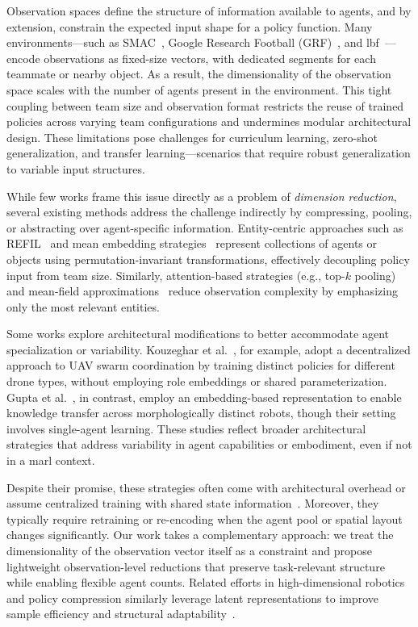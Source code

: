 Observation spaces define the structure of information available to agents, 
and by extension, constrain the expected input shape for a policy function.
Many environments—such as SMAC~\cite{samvelyan2019}, 
Google Research Football (GRF)~\cite{kurach2020}, 
and \gls{lbf}~\cite{papoudakis2021}—encode observations as fixed-size vectors, 
with dedicated segments for each teammate or nearby object. 
As a result, the dimensionality of the observation space scales with the 
number of agents present in the environment. 
This tight coupling between team size and observation format restricts the 
reuse of trained policies across varying team configurations and undermines 
modular architectural design. These limitations pose challenges for curriculum learning, 
zero-shot generalization, and transfer learning—scenarios that require robust generalization 
to variable input structures.

While few works frame this issue directly as a problem of \textit{dimension reduction}, 
several existing methods address the challenge indirectly by compressing, pooling, 
or abstracting over agent-specific information. Entity-centric approaches such as 
REFIL~\cite{iqbal2021} and mean embedding strategies~\cite{huttenrauch2019} represent 
collections of agents or objects using permutation-invariant transformations, effectively 
decoupling policy input from team size. Similarly, attention-based strategies 
(e.g., top-$k$ pooling) and mean-field approximations~\cite{yang2021a} reduce 
observation complexity by emphasizing only the most relevant entities.

Some works explore architectural modifications to better accommodate agent specialization 
or variability. Kouzeghar et al.~\cite{kouzeghar2023}, for example, adopt a decentralized 
approach to UAV swarm coordination by training distinct policies for different drone types, 
without employing role embeddings or shared parameterization. 
Gupta et al.~\cite{gupta2017a}, in contrast, employ an embedding-based representation to 
enable knowledge transfer across morphologically distinct robots, though their setting 
involves single-agent learning. These studies reflect broader architectural strategies that 
address variability in agent capabilities or embodiment, even if not in a \gls{marl} context.

Despite their promise, these strategies often come with architectural overhead or assume 
centralized training with shared state information~\cite{foerster2018}. Moreover, they typically 
require retraining or re-encoding when the agent pool or spatial layout changes significantly. 
Our work takes a complementary approach: we treat the dimensionality of the observation vector 
itself as a constraint and propose lightweight observation-level reductions that preserve 
task-relevant structure while enabling flexible agent counts. Related efforts in 
high-dimensional robotics and policy compression similarly leverage latent representations 
to improve sample efficiency and structural adaptability~\cite{bitzer2010, tangkaratt2016}.

